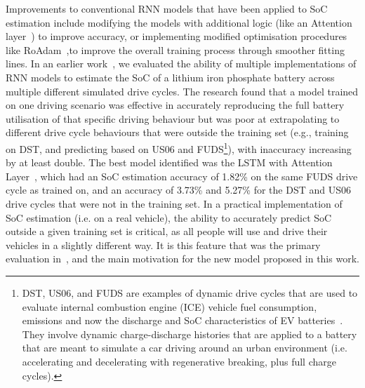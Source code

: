Improvements to conventional RNN models that have been applied to SoC estimation include modifying the models with additional logic (like an Attention layer~\cite{mamo_long_2020}) to improve accuracy, or implementing modified optimisation procedures like RoAdam~\cite{javid_adaptive_2020},to improve the overall training process through smoother fitting lines.
In an earlier work~\cite{sadykov_practical_2022}, we evaluated the ability of multiple implementations of RNN models to estimate the SoC of a lithium iron phosphate battery across multiple different simulated drive cycles.
The research found that a model trained on one driving scenario was effective in accurately reproducing the full battery utilisation of that specific driving behaviour but was poor at extrapolating to different drive cycle behaviours that were outside the training set (e.g., training on DST, and predicting based on US06 and FUDS\footnote{DST, US06, and FUDS are examples of dynamic drive cycles that are used to evaluate internal combustion engine (ICE) vehicle fuel consumption, emissions and now the discharge and SoC characteristics of EV batteries~\cite{castillo_18_2015}. They involve dynamic charge-discharge histories that are applied to a battery that are meant to simulate a car driving around an urban environment (i.e. accelerating and decelerating with regenerative breaking, plus full charge cycles).}), with inaccuracy increasing by at least double.
The best model identified was the LSTM with Attention Layer~\cite{mamo_long_2020}, which had an SoC estimation accuracy of 1.82\% on the same FUDS drive cycle as trained on, and an accuracy of 3.73\% and 5.27\% for the DST and US06 drive cycles that were not in the training set.
In a practical implementation of SoC estimation (i.e. on a real vehicle), the ability to accurately predict SoC outside a given training set is critical, as all people will use and drive their vehicles in a slightly different way.
It is this feature that was the primary evaluation in~\cite{sadykov_practical_2022}, and the main motivation for the new model proposed in this work.

